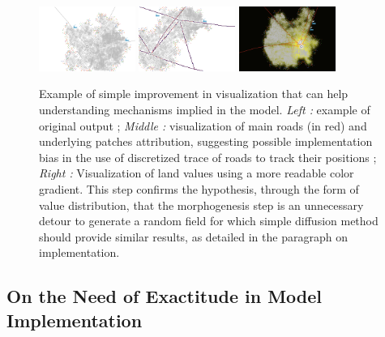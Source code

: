 \begin{figure}
\centering
\includegraphics[width=0.28\textwidth]{../../../Results/Reproduction/UrbanSuite/Tijuana/stdView}
\hfill
\includegraphics[width=0.28\textwidth]{../../../Results/Reproduction/UrbanSuite/Tijuana/ViewRoads}
\hfill
\includegraphics[width=0.28\textwidth]{../../../Results/Reproduction/UrbanSuite/Tijuana/landValues_cityFinished}
\caption{Example of simple improvement in visualization that can help understanding mechanisms implied in the model. \textit{Left : } example of original output ; \textit{Middle : } visualization of main roads (in red) and underlying patches attribution, suggesting possible implementation bias in the use of discretized trace of roads to track their positions ; \textit{Right : }Visualization of land values using a more readable color gradient. This step confirms the hypothesis, through the form of value distribution, that the morphogenesis step is an unnecessary detour to generate a random field for which simple diffusion method should provide similar results, as detailed in the paragraph on implementation.}
\label{fig:example_tij_viz}
\end{figure}








\subsection{On the Need of Exactitude in Model Implementation}














